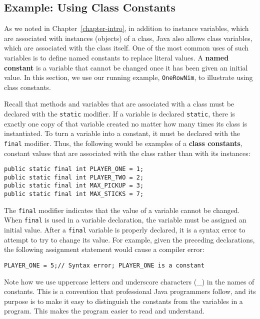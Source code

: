 \subsection{Example: Using Class Constants}

\noindent As we noted in Chapter~\ref{chapter-intro}, in
addition to instance variables, which are associated with instances
(objects) of a class, Java also allows class variables, which are
associated with the class itself.  One of the most common uses of such
variables is to define named constants to replace literal values. A
{\bf named constant} is a variable that cannot be changed once it has
been given an initial value.  In this section, we use our running
example, {\tt OneRowNim}, to illustrate using class constants.

Recall that methods and variables that are associated with a class must
be declared with the {\tt static} modifier.  If a variable is declared
{\tt static}, there is exactly one copy of that variable created no
matter how many times its class is instantiated.  To turn a variable
into a constant, it must be declared with the {\tt final} modifier.
Thus, the following would be examples of a {\bf class constants},
constant values that are associated with the class rather than with
its instances:

\begin{jjjlisting}
\begin{lstlisting}
public static final int PLAYER_ONE = 1;
public static final int PLAYER_TWO = 2;
public static final int MAX_PICKUP = 3;
public static final int MAX_STICKS = 7;
\end{lstlisting}
\end{jjjlisting}

\noindent The {\tt final} modifier indicates that the value of
a variable cannot be changed. When {\tt final} is used in a variable
declaration, the variable must be assigned an initial value. After a
{\tt final} variable is properly declared, it is a syntax error to
attempt to try to change its value. For example, given the
preceding declarations, the following assignment statement would
cause a compiler error:

\begin{jjjlisting}
\begin{lstlisting}
PLAYER_ONE = 5;// Syntax error; PLAYER_ONE is a constant
\end{lstlisting}
\end{jjjlisting}

\noindent Note how we use uppercase letters and underscore
characters (\_) in the names of constants. This is a convention
that professional Java programmers follow, and its purpose is
to make it easy to distinguish the constants from the variables
in a program. This makes the program easier to read and understand.

